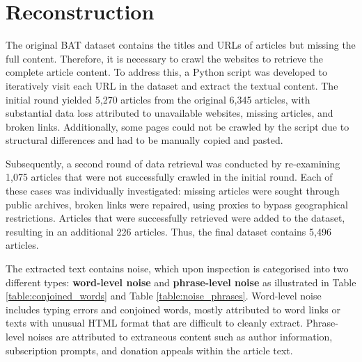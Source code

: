 \section{Reconstruction}

The original BAT dataset contains the titles and URLs of articles but missing the full content. Therefore, it is necessary to crawl the websites to retrieve the complete article content. To address this, a Python script was developed to iteratively visit each URL in the dataset and extract the textual content. The initial round yielded 5,270 articles from the original 6,345 articles, with substantial data loss attributed to unavailable websites, missing articles, and broken links. Additionally, some pages could not be crawled by the script due to structural differences and had to be manually copied and pasted.

Subsequently, a second round of data retrieval was conducted by re-examining 1,075 articles that were not successfully crawled in the initial round. Each of these cases was individually investigated: missing articles were sought through public archives, broken links were repaired, using proxies to bypass geographical restrictions. Articles that were successfully retrieved were added to the dataset, resulting in an additional 226 articles. Thus, the final dataset contains 5,496 articles.

The extracted text contains noise, which upon inspection is categorised into two different types: \textbf{word-level noise} and \textbf{phrase-level noise} as illustrated in Table \ref{table:conjoined_words} and Table \ref{table:noise_phrases}. Word-level noise includes typing errors and conjoined words, mostly attributed to word links or texts with unusual HTML format that are difficult to cleanly extract. Phrase-level noises are attributed to extraneous content such as author information, subscription prompts, and donation appeals within the article text.

